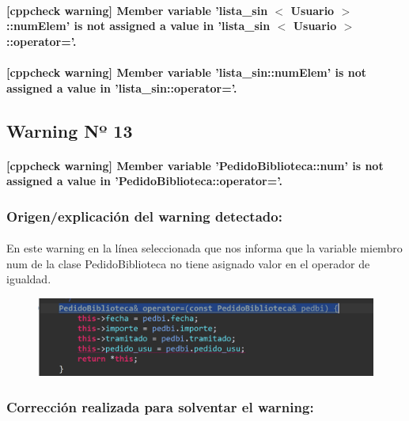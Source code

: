 			\paragraph{[cppcheck warning] Member variable 'lista\_sin $<$ Usuario $>$::numElem' is not assigned a value in 'lista\_sin $<$ Usuario $>$::operator='.}
			
			\paragraph{[cppcheck warning] Member variable 'lista\_sin::numElem' is not assigned a value in 'lista\_sin::operator='.}
			
	\subsection{Warning Nº 13}
	
		\paragraph{ [cppcheck warning]  Member variable 'PedidoBiblioteca::num' is not assigned a value in 'PedidoBiblioteca::operator='.}
	
		\subsubsection{Origen/explicación del warning detectado:}
		
			\paragraph{}En este warning en la línea seleccionada que nos informa que la variable miembro num de la clase PedidoBiblioteca no tiene asignado valor en el operador de igualdad.
			
			\begin{figure}[H]
				\centering
				\includegraphics[scale=0.55]{img/esteban8.png}
				\label{esteban8}
			\end{figure}
		
		\subsubsection{Corrección realizada para solventar el warning:}
		
